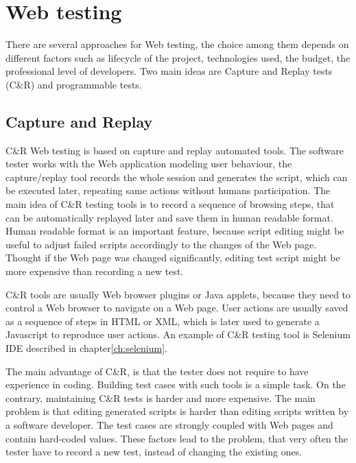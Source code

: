 	\chapter{Web testing}
	\label{ch:Webtesting}

		There are several approaches for Web testing, the choice among them depends on
		different factors such as lifecycle of the project, technologies used, the
		budget, the professional level of developers. Two main ideas are Capture and
		Replay tests (C\&R) and programmable tests.
		
		\section{Capture and Replay}
		\label{sec:captureReplay}
			C\&R Web testing is based on capture and replay automated
			tools.  The software tester works with the Web
			application modeling user behaviour, the capture/replay tool records the
			whole session and generates the script, which can be executed later,
			repeating same actions without humans participation. The main idea of C\&R
			testing tools is to record a sequence of browsing steps, that can be
			automatically replayed later and save them in human readable format. Human
			readable format is an important feature, because script editing might
			 be useful to adjust failed scripts accordingly	to the changes of the Web page.
			 Thought if the Web page was changed
			significantly, editing test script might be more expensive than recording a
			new test\cite{CaptureReplay7}. 
			
C\&R tools are usually Web browser plugins or Java applets, because they
need to control a Web browser to navigate on a Web page. User actions are
usually saved as a sequence of steps in HTML or XML, which is later used to
generate a Javascript to reproduce user actions. An example of C\&R testing
tool is Selenium IDE described in chapter\ref{ch:selenium}.

The main advantage of C\&R, is that the tester does not
require to have experience in coding. Building test cases with such tools
is a simple task.
On the contrary, maintaining C\&R tests is harder and more expensive.
The main problem is that editing generated scripts is harder than editing
scripts written by a software developer. The test cases are strongly coupled
with Web pages and contain hard-coded values. These factors lead to the
problem, that very often the tester have to record a new test, instead of
changing the existing ones.

